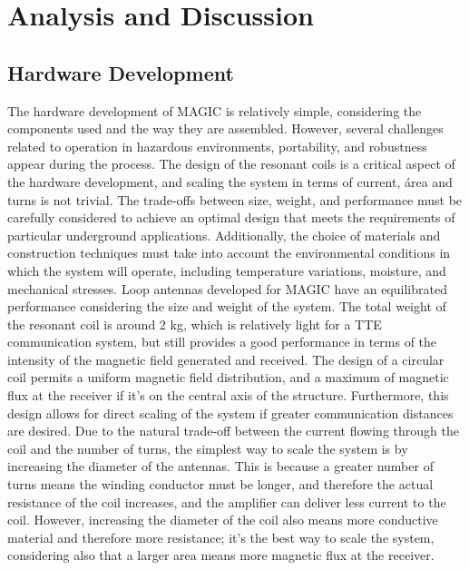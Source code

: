 \chapter{Analysis and Discussion}\label{ch:discussion}

\section{Hardware Development}
 The hardware development of MAGIC is relatively simple, considering the components used and the way they are assembled. However, several challenges related to operation in hazardous environments, portability, and robustness appear during the process.
 \newp
 The design of the resonant coils is a critical aspect of the hardware development, and scaling the system in terms of current, área and turns is not trivial. The trade-offs between size, weight, and performance must be carefully considered to achieve an optimal design that meets the requirements of particular underground applications.
 \newp
    Additionally, the choice of materials and construction techniques must take into account the environmental conditions in which the system will operate, including temperature variations, moisture, and mechanical stresses.
\newp
Loop antennas developed for MAGIC have an equilibrated performance considering the size and weight of the system. The total weight of the resonant coil is around 2 kg, which is relatively light for a TTE communication system, but still provides a good performance in terms of the intensity of the magnetic field generated and received. The design of a circular coil permits a uniform magnetic field distribution, and a maximum of magnetic flux at the receiver if it's on the central axis of the structure. Furthermore, this design allows for direct scaling of the system if greater communication distances are desired. Due to the natural trade-off between the current flowing through the coil and the number of turns, the simplest way to scale the system is by increasing the diameter of the antennas. This is because a greater number of turns means the winding conductor must be longer, and therefore the actual resistance of the coil increases, and the amplifier can deliver less current to the coil. However, increasing the diameter of the coil also means more conductive material and therefore more resistance; it's the best way to scale the system, considering also that a larger area means more magnetic flux at the receiver.

